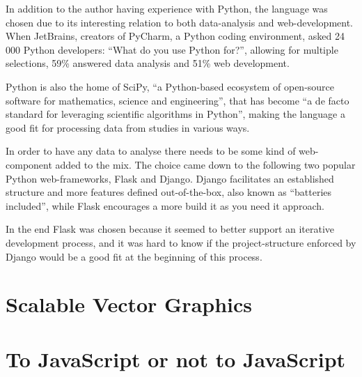   In addition to the author having experience with Python, the language was
  chosen due to its interesting relation to both data-analysis and
  web-development. When
  JetBrains\cite{citeJetBrains},
  creators of
  PyCharm\cite{citePyCharm},
  a Python coding environment, asked 24 000 Python
  developers:
  ``What do you use Python for?''\cite{citeJetSurvey}, allowing for multiple
  selections, 59\% answered data analysis and 51\% web development.

  Python is also the home of SciPy, ``a Python-based ecosystem of open-source
  software for mathematics, science and engineering''\cite{citeSciPyHomepage},
  that has become ``a de facto
  standard for leveraging scientific algorithms in
  Python''\cite{citeSciPyPaper}, making the language a good fit for processing
  data from studies in various ways.

  In order to have any data to analyse there needs to be some kind of
  web-component added to the mix. The choice came down to the following two
  popular Python web-frameworks, Flask\cite{citeFlaskHomepage} and
  Django\cite{citeDjangoHomepage}. Django facilitates an established structure
  and more features defined out-of-the-box, also known as ``batteries
  included'', while Flask encourages a more build it as you need it approach.

  In the end Flask was chosen because it seemed to better support an iterative
  development process, and it was hard to know if the project-structure enforced
  by Django would be a good fit at the beginning of this process.


%
%

\section{Scalable Vector Graphics}

\section{To JavaScript or not to JavaScript}

